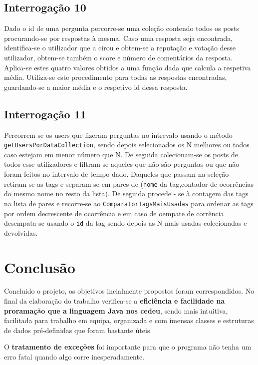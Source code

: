 \documentclass[11pt,a4paper]{article}
\begin{document}
\subsection{Interrogação 10}

Dado o id de uma pergunta percorre-se uma coleção contendo todos os posts procurando-se por respostas à mesma. Caso uma resposta seja encontrada, identifica-se o utilizador que a cirou e obtem-se a reputação e votação desse utilizador, obtem-se também o score e número de comentários da resposta.
Aplica-se estes quatro valores obtidos a uma função dada que calcula a respetiva média.
Utiliza-se este procedimento para todas as respostas encontradas, guardando-se a maior média e o respetivo id dessa resposta.

\subsection{Interrogação 11}

Percorrem-se os users que fizeram perguntas no intrevalo usando o método \texttt{getUsersPorDataCollection}, sendo depois selecionados os N melhores ou todos caso estejam em menor número que N.
De seguida colecionam-se os posts de todos esse utilizadores e filtram-se aqueles que não são perguntas ou que não foram feitos no intervalo de tempo dado.
Daqueles que passam na seleção retiram-se as tags e separam-se em pares de (\texttt{nome} da tag,contador de ocorrências do mesmo nome no resto da lista).
De seguida procede - se à contagem das tags na lista de pares e recorre-se ao \texttt{ComparatorTagsMaisUsadas} para ordenar as tags por ordem decrescente de ocorrência e em caso de oempate de corrência desempata-se usando o \texttt{id} da tag sendo depois as N mais usadas colecionadas e devolvidas.

\newpage
\section{Conclusão}

\label{sec:conclusao}
Concluido o projeto, os objetivos incialmente propostos foram correspondidos. No final da elaboração do trabalho verifica-se a \textbf{eficiência e facilidade na proramação que a linguagem Java nos cedeu}, sendo mais intuitiva, facilitada para trabalho em equipa, organizada e com imensas classes e estruturas de dados pré-definidas que foram bastante úteis.\newline

O \textbf{tratamento de exceções} foi importante para que o programa não tenha um erro fatal quando algo corre inesperadamente.\newline
\end{document}
